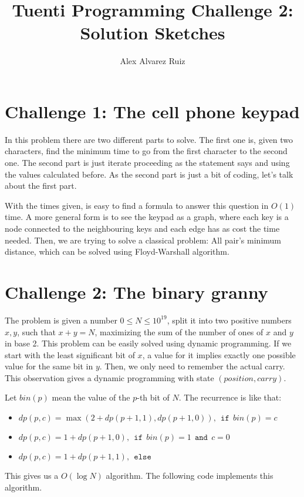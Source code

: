 \documentclass[english,12pt,a4paper]{article}
\begin{document}
\renewcommand{\figurename}{Gr\'afica} 

\title{Tuenti Programming Challenge 2: Solution Sketches}

\author{Alex Alvarez Ruiz}


\maketitle


\newpage \tableofcontents\newpage
\sloppy
\parskip=8pt

\section{Challenge 1: The cell phone keypad}
In this problem there are two different parts to solve. The first one is, given two characters, find the minimum time to go from the first character to the second one. The second part is just iterate proceeding as the statement says and using the values calculated before. As the second part is just a bit of coding, let's talk about the first part.

With the times given, is easy to find a formula to answer this question in $O(1)$ time. A more general form is to see the keypad as a graph, where each key is a node connected to the neighbouring keys and each edge has as cost the time needed. Then, we are trying to solve a classical problem: All pair's minimum distance, which can be solved using Floyd-Warshall algorithm.



\newpage
\section{Challenge 2: The binary granny}
The problem is given a number $0 \leq N \leq 10^{19}$, split it into two positive numbers $x,y$, such that $x + y = N$, maximizing the sum of the number of ones of $x$ and $y$ in base 2. This problem can be easily solved using dynamic programming. If we start with the least significant bit of $x$, a value for it implies exactly one possible value for the same bit in $y$. Then, we only need to remember the actual carry. This observation gives a dynamic programming with state $(position, carry)$.

Let $bin(p)$ mean the value of the $p$-th bit of $N$. The recurrence is like that:
\begin{itemize}
\item $dp(p, c) = \max(2 + dp(p + 1, 1), dp(p + 1, 0)), ~~ \mathtt{if} ~~bin(p) = c$
\item $dp(p, c) = 1 + dp(p + 1, 0), ~~ \mathtt{if} ~~ bin(p) = 1 ~~\mathtt{and} ~~c = 0$
\item $dp(p, c) = 1 + dp(p + 1, 1), ~~ \mathtt{else}$
\end{itemize}
This gives us a $O(\log N)$ algorithm. The following code implements this algorithm.
\end{document}
